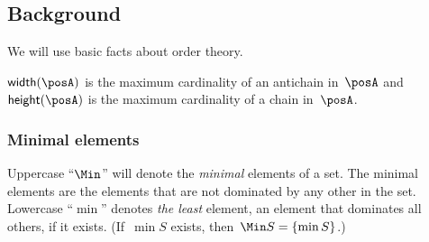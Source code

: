\subsection{Background\label{sec:Background}}

We will use basic facts about order theory.





\begin{definition}
\label{def:poset-width-height} $\mathsf{width}(\posA)$ is the maximum
cardinality of an antichain in~$\posA$ and $\mathsf{height}(\posA)$
is the maximum cardinality of a chain in~$\posA$.
\end{definition}


\subsubsection{Minimal elements}

Uppercase ``$\Min$'' will denote the \emph{minimal} elements of
a set. The minimal elements are the elements that are not dominated
by any other in the set. Lowercase ``$\min$'' denotes\emph{ the
least} element, an element that dominates all others, if it exists.
(If~$\min S$ exists, then~$\Min S=\{\min S\}$.)

